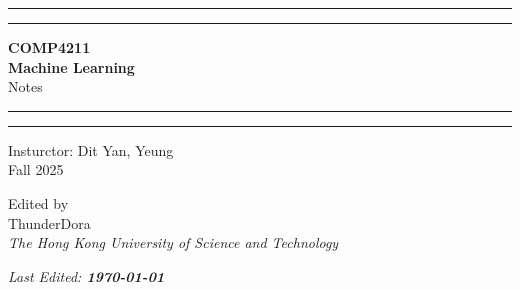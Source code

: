 \documentclass[twoside]{article}
\numberwithin{equation}{section}
\begin{document}
	\begin{titlepage}
		\centering
		\scshape
		\vspace*{\baselineskip}
		
		\rule{\textwidth}{1.6pt}\vspace{-\baselineskip}\vspace{2pt} %
		\rule{\textwidth}{0.4pt} %
		
		\vspace{0.5\baselineskip}
		
		{\LARGE \textbf{COMP4211 \\ Machine Learning} \\
			
			\vspace{0.75\baselineskip}
			\Large Notes}
		
		\vspace{0.5\baselineskip}
		
		\rule{\textwidth}{0.4pt}\vspace{-\baselineskip}\vspace{3.2pt} %
		\rule{\textwidth}{1.6pt} %
		
		\vspace{1.5\baselineskip}
		
		{\large Insturctor: Dit Yan, Yeung \\
			\vspace{0.5\baselineskip} Fall 2025}
		
		\vspace{\baselineskip}
		
		{\Large Edited by \\
			\vspace{0.5\baselineskip}
			\Large ThunderDora \\

			\vspace{10pt}
			\large \textit{The Hong Kong University of Science and Technology}}
		
		\vspace{10\baselineskip}
		
		\textit{Last Edited: \textbf{\today}}
		
	\end{titlepage}
	
	\newpage
	
	\pagestyle{fancy}
	\fancyhf{}
	\renewcommand{\headrulewidth}{0pt}
	
\end{document}
